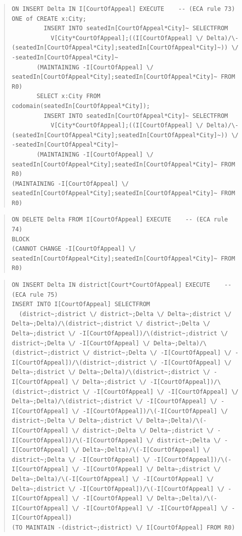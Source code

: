 \documentclass[10pt,a4paper]{report}              %
\theoremstyle{plain}\theorembodyfont{\rmfamily}\newtheorem{definition}{Definition}[section]
\theoremstyle{plain}\theorembodyfont{\rmfamily}\newtheorem{designrule}[definition]{Requirement}
\begin{document}
\begin{quote}
\begin{verbatim}
ON INSERT Delta IN I[CourtOfAppeal] EXECUTE    -- (ECA rule 73)
ONE of CREATE x:City;
         INSERT INTO seatedIn[CourtOfAppeal*City]~ SELECTFROM
           V[City*CourtOfAppeal];((I[CourtOfAppeal] \/ Delta)/\-(seatedIn[CourtOfAppeal*City];seatedIn[CourtOfAppeal*City]~)) \/ -seatedIn[CourtOfAppeal*City]~
       (MAINTAINING -I[CourtOfAppeal] \/ seatedIn[CourtOfAppeal*City];seatedIn[CourtOfAppeal*City]~ FROM R0)
       SELECT x:City FROM codomain(seatedIn[CourtOfAppeal*City]);
         INSERT INTO seatedIn[CourtOfAppeal*City]~ SELECTFROM
           V[City*CourtOfAppeal];((I[CourtOfAppeal] \/ Delta)/\-(seatedIn[CourtOfAppeal*City];seatedIn[CourtOfAppeal*City]~)) \/ -seatedIn[CourtOfAppeal*City]~
       (MAINTAINING -I[CourtOfAppeal] \/ seatedIn[CourtOfAppeal*City];seatedIn[CourtOfAppeal*City]~ FROM R0)
(MAINTAINING -I[CourtOfAppeal] \/ seatedIn[CourtOfAppeal*City];seatedIn[CourtOfAppeal*City]~ FROM R0)
\end{verbatim}
\end{quote}
\begin{quote}
\begin{verbatim}
ON DELETE Delta FROM I[CourtOfAppeal] EXECUTE    -- (ECA rule 74)
BLOCK
(CANNOT CHANGE -I[CourtOfAppeal] \/ seatedIn[CourtOfAppeal*City];seatedIn[CourtOfAppeal*City]~ FROM R0)
\end{verbatim}
\end{quote}
\begin{quote}
\begin{verbatim}
ON INSERT Delta IN district[Court*CourtOfAppeal] EXECUTE    -- (ECA rule 75)
INSERT INTO I[CourtOfAppeal] SELECTFROM
  (district~;district \/ district~;Delta \/ Delta~;district \/ Delta~;Delta)/\(district~;district \/ district~;Delta \/ Delta~;district \/ -I[CourtOfAppeal])/\(district~;district \/ district~;Delta \/ -I[CourtOfAppeal] \/ Delta~;Delta)/\(district~;district \/ district~;Delta \/ -I[CourtOfAppeal] \/ -I[CourtOfAppeal])/\(district~;district \/ -I[CourtOfAppeal] \/ Delta~;district \/ Delta~;Delta)/\(district~;district \/ -I[CourtOfAppeal] \/ Delta~;district \/ -I[CourtOfAppeal])/\(district~;district \/ -I[CourtOfAppeal] \/ -I[CourtOfAppeal] \/ Delta~;Delta)/\(district~;district \/ -I[CourtOfAppeal] \/ -I[CourtOfAppeal] \/ -I[CourtOfAppeal])/\(-I[CourtOfAppeal] \/ district~;Delta \/ Delta~;district \/ Delta~;Delta)/\(-I[CourtOfAppeal] \/ district~;Delta \/ Delta~;district \/ -I[CourtOfAppeal])/\(-I[CourtOfAppeal] \/ district~;Delta \/ -I[CourtOfAppeal] \/ Delta~;Delta)/\(-I[CourtOfAppeal] \/ district~;Delta \/ -I[CourtOfAppeal] \/ -I[CourtOfAppeal])/\(-I[CourtOfAppeal] \/ -I[CourtOfAppeal] \/ Delta~;district \/ Delta~;Delta)/\(-I[CourtOfAppeal] \/ -I[CourtOfAppeal] \/ Delta~;district \/ -I[CourtOfAppeal])/\(-I[CourtOfAppeal] \/ -I[CourtOfAppeal] \/ -I[CourtOfAppeal] \/ Delta~;Delta)/\(-I[CourtOfAppeal] \/ -I[CourtOfAppeal] \/ -I[CourtOfAppeal] \/ -I[CourtOfAppeal])
(TO MAINTAIN -(district~;district) \/ I[CourtOfAppeal] FROM R0)
\end{verbatim}
\end{quote}
\end{document}
